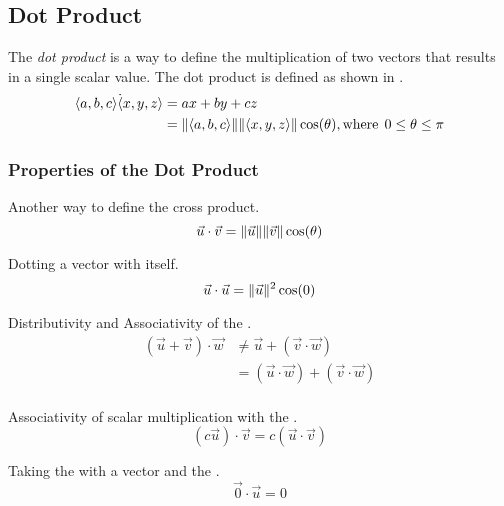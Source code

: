 \subsection{Dot Product}\label{subsec:Vector_Dot_Product}
\begin{definition}\label{def:Dot_Product}
  The \emph{dot product} is a way to define the multiplication of two vectors that results in a single scalar value.
  The dot product is defined as shown in .
  \begin{equation}\label{eq:Dot_Product}
    \begin{aligned}
      \langle a, b, c \rangle \dot \langle x, y, z \rangle &= ax + by + cz \\
      &= \lVert \langle a, b, c \rangle \rVert \lVert \langle x, y, z \rangle \rVert \cos(\theta), \text{where} \:\: 0 \leq \theta \leq \pi \\
    \end{aligned}
  \end{equation}
\end{definition}

\subsubsection{Properties of the Dot Product}\label{subsubsec:Dot_Product_Properties}
\begin{propertylist}
\item Another way to define the cross product.\label{prop:Dot_Product_Magnitude_Angle}
  \begin{equation*}
    \vec{u} \cdot \vec{v} = \lVert \vec{u} \rVert \lVert \vec{v} \rVert \cos(\theta)
  \end{equation*}
\item Dotting a vector with itself.
  \begin{equation*}
    \vec{u} \cdot \vec{u} = \lVert \vec{u} \rVert^{2} \cos(0)
  \end{equation*}
\item Distributivity and Associativity of the .
  \begin{equation*}
    \begin{aligned}
      (\vec{u} + \vec{v}) \cdot \vec{w} &\neq \vec{u} + (\vec{v} \cdot \vec{w}) \\
      &= (\vec{u} \cdot \vec{w}) + (\vec{v} \cdot \vec{w}) \\
    \end{aligned}
  \end{equation*}
\item Associativity of scalar multiplication with the .
  \begin{equation*}
    (c \vec{u}) \cdot \vec{v} = c(\vec{u} \cdot \vec{v})
  \end{equation*}
\item Taking the  with a vector and the .
  \begin{equation*}
    \vec{0} \cdot \vec{u} = 0
  \end{equation*}
\end{propertylist}


